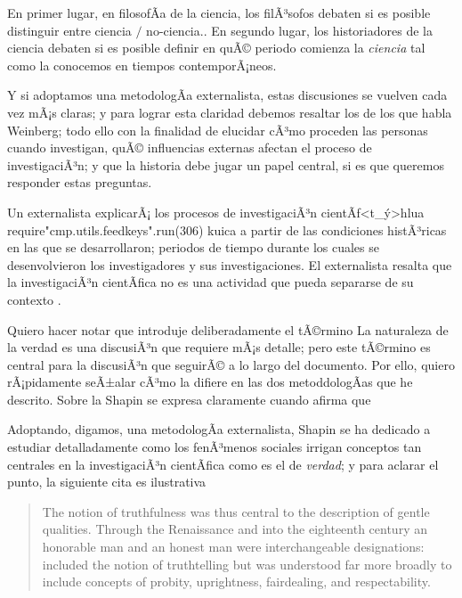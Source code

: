 En primer lugar, en filosofÃ­a de la ciencia, los filÃ³sofos debaten si es posible distinguir entre ciencia $/$ no-ciencia..
En segundo lugar, los historiadores de la ciencia debaten si es posible definir en quÃ© periodo comienza la \emph{ciencia} tal como la conocemos en tiempos contemporÃ¡neos.

Y si adoptamos una metodologÃ­a externalista, estas discusiones se vuelven cada vez mÃ¡s claras; y para lograr esta claridad debemos resaltar los  de los que habla Weinberg; todo ello con la finalidad de elucidar cÃ³mo proceden las personas cuando investigan, quÃ© influencias externas afectan el proceso de investigaciÃ³n; y que la historia debe jugar un papel central, si es que queremos responder estas preguntas.

Un externalista explicarÃ¡ los procesos de investigaciÃ³n
cientÃ­f<t_ý>hlua require"cmp.utils.feedkeys".run(306) kuica
a partir de las condiciones histÃ³ricas en las que se desarrollaron;
periodos de tiempo durante los cuales se desenvolvieron los investigadores
y sus investigaciones. El externalista resalta que la investigaciÃ³n
cientÃ­fica no es una actividad que pueda separarse de su contexto
.

Quiero hacer notar que introduje deliberadamente el tÃ©rmino 
La naturaleza de la verdad es una discusiÃ³n que requiere mÃ¡s detalle; pero este tÃ©rmino es central para la discusiÃ³n que seguirÃ© a lo largo del documento.
Por ello, quiero rÃ¡pidamente seÃ±alar cÃ³mo la  difiere en las dos metoddologÃ­as que he descrito.
Sobre la  Shapin se expresa claramente cuando afirma que  \parencite[CapÃ­tulo 2]{shapin2010never}

Adoptando, digamos, una metodologÃ­a externalista, Shapin se ha dedicado a estudiar detalladamente como los fenÃ³menos sociales irrigan conceptos tan centrales en la investigaciÃ³n cientÃ­fica como es el de \emph{verdad}; y para aclarar el punto, la siguiente cita es ilustrativa

\begin{quote}
	The notion of truthfulness was thus central to the description of gentle qualities.
	Through the Renaissance and into the eighteenth century an honorable man and an honest man were interchangeable designations:  included the notion of truthtelling but was understood far more broadly to include concepts of probity, uprightness, fairdealing, and respectability. \parencite[pp. 70-71]{Shapin1995}
\end{quote}

